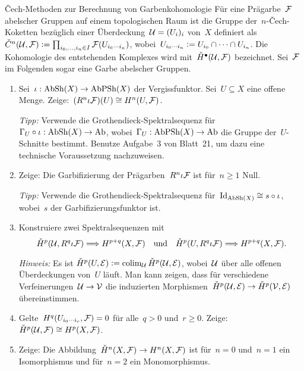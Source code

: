 \documentclass{uebblatt}
\begin{document}

\begin{aufgabe}{Čech-Methoden zur Berechnung von Garbenkohomologie}
Für eine Prägarbe~$\mathcal{F}$ abelscher Gruppen auf einem topologischen Raum ist die
Gruppe der~$n$-Čech-Koketten bezüglich einer Überdeckung~$\mathcal{U} = (U_i)_i$ von~$X$
definiert als~$\check C^n(\mathcal{U}, \mathcal{F}) \vcentcolon= \prod_{i_0,\ldots,i_n \in I}
\mathcal{F}(U_{i_0 \cdots i_n})$, wobei~$U_{i_0 \cdots i_n} \vcentcolon= U_{i_0} \cap \cdots
\cap U_{i_n}$. Die Kohomologie des entstehenden Komplexes wird mit~$\check
H^\bullet(\mathcal{U}, \mathcal{F})$ bezeichnet. Sei~$\mathcal{F}$ im Folgenden sogar eine Garbe abelscher Gruppen.
\begin{enumerate}
\item Sei~$\iota : \mathrm{AbSh}(X) \to
\mathrm{AbPSh}(X)$ der Vergissfunktor. Sei~$U \subseteq X$ eine offene Menge.
Zeige:~$(R^n \iota\mathcal{F})(U) \cong H^n(U, \mathcal{F})$.

{\tiny\emph{Tipp:} Verwende die Grothendieck-Spektralsequenz für~$\Gamma_U
\circ \iota : \mathrm{AbSh}(X) \to \mathrm{Ab}$, wobei~$\Gamma_U : \mathrm{AbPSh}(X) \to \mathrm{Ab}$ die
Gruppe der~$U$-Schnitte bestimmt. Benutze Aufgabe~3 von Blatt~21, um dazu eine
technische Voraussetzung nachzuweisen.\par}
\item Zeige: Die Garbifizierung der Prägarben~$R^n \iota \mathcal{F}$ ist für~$n \geq 1$
Null.

{\tiny\emph{Tipp:} Verwende die Grothendieck-Spektralsequenz
für~$\mathrm{Id}_{\mathrm{AbSh}(X)} \cong s \circ \iota$, wobei~$s$ der Garbifizierungsfunktor
ist.\par}
\item Konstruiere zwei Spektralsequenzen mit
\[ \check H^p(\mathcal{U}, R^q \iota \mathcal{F}) \Longrightarrow H^{p+q}(X, \mathcal{F})
  \quad\text{und}\quad
  \check H^p(U, R^q \iota \mathcal{F}) \Longrightarrow H^{p+q}(X, \mathcal{F}). \]
{\tiny\emph{Hinweis:} Es ist $\check H^p(U,\mathcal{E}) \vcentcolon= \operatorname{colim}_{\mathcal{U}} \check H^p(\mathcal{U},\mathcal{E})$,
wobei~$\mathcal{U}$ über alle offenen Überdeckungen von~$U$ läuft. Man kann zeigen, dass
für verschiedene Verfeinerungen~$\mathcal{U} \to \mathcal{V}$ die induzierten
Morphismen~$\check H^p(\mathcal{U},\mathcal{E}) \to \check H^p(\mathcal{V},\mathcal{E})$ übereinstimmen.\par}
\item Gelte~$H^q(U_{i_0 \cdots i_r}, \mathcal{F}) = 0$ für alle~$q > 0$ und~$r \geq 0$.
Zeige: $\check H^p(\mathcal{U}, \mathcal{F}) \cong H^p(X, \mathcal{F})$.
\item Zeige: Die Abbildung~$\check H^n(X,\mathcal{F}) \to H^n(X,\mathcal{F})$ ist für~$n = 0$
und~$n = 1$ ein Isomorphismus und für~$n = 2$ ein Monomorphismus.


\end{enumerate}
\end{aufgabe}
\end{document}
